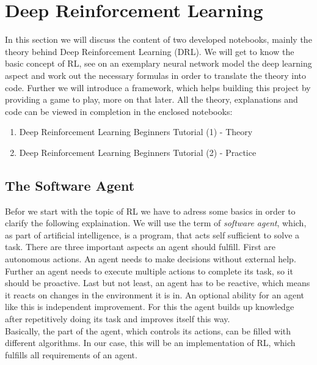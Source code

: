 \section{Deep Reinforcement Learning}
	In this section we will discuss the content of two developed notebooks, mainly the theory behind Deep Reinforcement Learning (DRL). We will get to know the basic concept of RL, see on an exemplary neural network model the deep learning aspect and work out the necessary formulas in order to translate the theory into code. Further we will introduce a framework, which helps building this project by providing a game to play, more on that later.  All the theory, explanations and code can be viewed in completion in the enclosed notebooks:
	\begin{enumerate}
		\item Deep Reinforcement Learning Beginners Tutorial (1) - Theory 
		\item Deep Reinforcement Learning Beginners Tutorial (2) - Practice
	\end{enumerate}

\subsection{The Software Agent}
	Befor we start with the topic of RL we have to adress some basics in order to clarify the following explaination. We will use the term of \textit{software agent}, which, as part of artificial intelligence, is a program, that acts self sufficient to solve a task. There are three important aspects an agent should fulfill. First are autonomous actions. An agent needs to make decisions without external help. Further an agent needs to execute multiple actions to complete its task, so it should be proactive. Last but not least, an agent has to be reactive, which means it reacts on changes in the environment it is in. An optional ability for an agent like this is independent improvement. For this the agent builds up knowledge after repetitively doing its task and improves itself this way.\\
	Basically, the part of the agent, which controls its actions, can be filled with different algorithms. In our case, this will be an implementation of RL, which fulfills all requirements of an agent.

